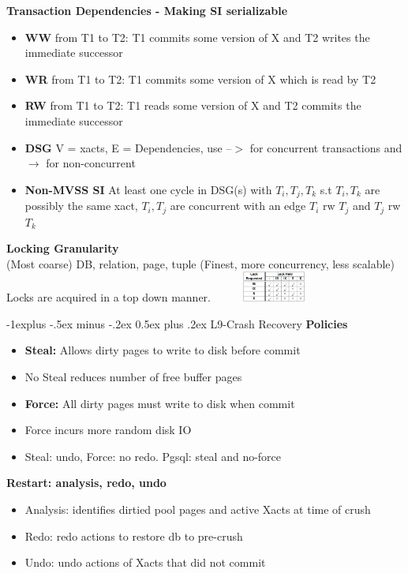 \documentclass[10pt, landscape]{article}
\makeatletter
\renewcommand{\subsection}{\@startsection{subsection}{2}{0mm}%
                                {-1explus -.5ex minus -.2ex}%
                                {0.5ex plus .2ex}%
                                {\normalfont\normalsize\bfseries}}
\makeatother
\begin{document}
\begin{multicols}{4}
\textbf{Transaction Dependencies - Making SI serializable} \\
\begin{itemize}
  \item \textbf{WW} from T1 to T2: T1 commits some version of X and T2 writes the immediate successor
  \item \textbf{WR} from T1 to T2: T1 commits some version of X which is read by T2
  \item \textbf{RW} from T1 to T2: T1 reads some version of X and T2 commits the immediate successor
  \item \textbf{DSG} V = {xacts}, E = {Dependencies}, use --$>$ for concurrent transactions and $\rightarrow$ for non-concurrent
  \item \textbf{Non-MVSS SI} At least one cycle in DSG(s) with $T_i, T_j, T_k$ s.t $T_i,T_k$ are possibly the same xact, $T_i, T_j$ are concurrent with an edge $T_i$ rw $T_j$ and $T_j$ rw $T_k$
\end{itemize}

\textbf{Locking Granularity} \\ 
(Most coarse) DB, relation, page, tuple (Finest, more concurrency, less scalable) \\ 
Locks are acquired in a top down manner.
\includegraphics[width=4cm, height =1cm]{multigranular_locks.png}


\subsection{L9-Crash Recovery}
\textbf{Policies} \\
\begin{itemize}
  \item \textbf{Steal:} Allows dirty pages to write to disk before commit
  \item No Steal reduces number of free buffer pages
  \item \textbf{Force:} All dirty pages must write to disk when commit
  \item Force incurs more random disk IO
  \item Steal: undo, Force: no redo. Pgsql: steal and no-force
\end{itemize}

\textbf{Restart: analysis, redo, undo} \\
\begin{itemize}
  \item Analysis: identifies dirtied pool pages and active Xacts at time of crush
  \item Redo: redo actions to restore db to pre-crush
  \item Undo: undo actions of Xacts that did not commit
\end{itemize}


\end{multicols}
\end{document}
